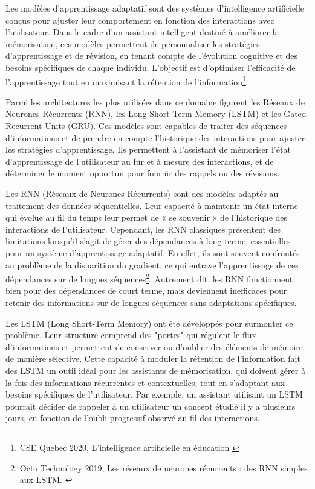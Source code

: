 \documentclass[11pt,a4paper]{report}
\begin{document}
Les modèles d’apprentissage adaptatif sont des systèmes d’intelligence artificielle conçus pour ajuster leur comportement en fonction des interactions avec l'utilisateur. Dans le cadre d'un assistant intelligent destiné à améliorer la mémorisation, ces modèles permettent de personnaliser les stratégies d’apprentissage et de révision, en tenant compte de l'évolution cognitive et des besoins spécifiques de chaque individu. L’objectif est d'optimiser l'efficacité de l'apprentissage tout en maximisant la rétention de l'information\footnote{CSE Quebec 2020, L’intelligence artificielle en éducation \cite{hypotheses}}.

Parmi les architectures les plus utilisées dans ce domaine figurent les Réseaux de Neurones Récurrents (RNN), les Long Short-Term Memory (LSTM) et les Gated Recurrent Units (GRU). Ces modèles sont capables de traiter des séquences d'informations et de prendre en compte l’historique des interactions pour ajuster les stratégies d’apprentissage. Ils permettent à l’assistant de mémoriser l’état d’apprentissage de l’utilisateur au fur et à mesure des interactions, et de déterminer le moment opportun pour fournir des rappels ou des révisions.

Les RNN (Réseaux de Neurones Récurrents) sont des modèles adaptés au traitement des données séquentielles. Leur capacité à maintenir un état interne qui évolue au fil du temps leur permet de « se souvenir » de l’historique des interactions de l’utilisateur. Cependant, les RNN classiques présentent des limitations lorsqu'il s'agit de gérer des dépendances à long terme, essentielles pour un système d’apprentissage adaptatif. En effet, ils sont souvent confrontés au problème de la disparition du gradient, ce qui entrave l'apprentissage de ces dépendances sur de longues séquences\footnote{Octo Technology 2019, Les réseaux de neurones récurrents : des RNN simples aux LSTM. \cite{octo}}. Autrement dit, les RNN fonctionnent bien pour des dépendances de court terme, mais deviennent inefficaces pour retenir des informations sur de longues séquences sans adaptations spécifiques.

Les LSTM (Long Short-Term Memory) ont été développés pour surmonter ce problème. Leur structure comprend des "portes" qui régulent le flux d’informations et permettent de conserver ou d’oublier des éléments de mémoire de manière sélective. Cette capacité à moduler la rétention de l’information fait des LSTM un outil idéal pour les assistants de mémorisation, qui doivent gérer à la fois des informations récurrentes et contextuelles, tout en s’adaptant aux besoins spécifiques de l'utilisateur. Par exemple, un assistant utilisant un LSTM pourrait décider de rappeler à un utilisateur un concept étudié il y a plusieurs jours, en fonction de l'oubli progressif observé au fil des interactions.
\end{document}
